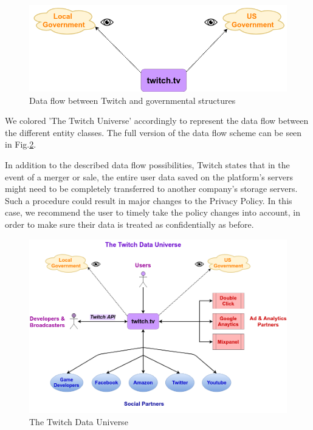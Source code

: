 \begin{figure}[h!]
	\centering
	\includegraphics[width=0.7\linewidth]{sections/figures/twitch_government}
	\caption{Data flow between Twitch and governmental structures}
	\label{fig:twitch_government}
\end{figure}

We colored 'The Twitch Universe' accordingly to represent the data flow between the different entity classes. The full version of the data flow scheme can be seen in Fig.\ref{fig:twitch_data_universe}. 

In addition to the described data flow possibilities, Twitch states that in the event of a merger or sale, the entire user data saved on the platform's servers might need to be completely transferred to another company's storage servers. Such a procedure could result in major changes to the Privacy Policy. In this case, we recommend the user to timely take the policy changes into account, in order to make sure their data is treated as confidentially as before. 

\begin{figure}[h!]
	\centering
	\includegraphics[width=0.9\linewidth]{sections/figures/twitch_data_universe}
	\caption{The Twitch Data Universe}
	\label{fig:twitch_data_universe}
\end{figure}


